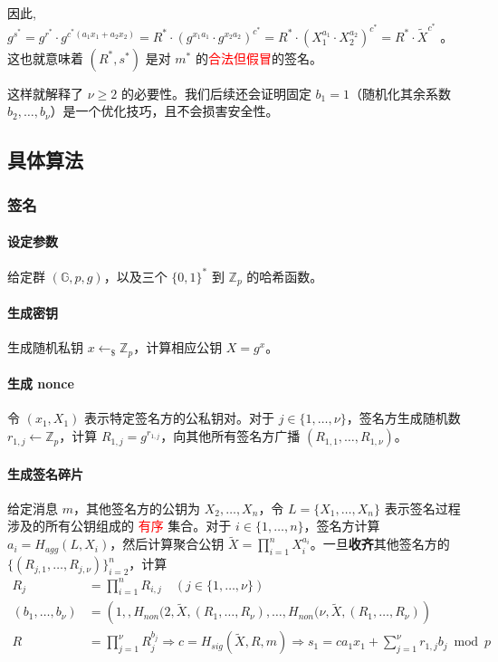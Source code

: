 \documentclass[a4paper,10pt]{article}
\newcommand{\bG}{\mathbb{G}}
\newcommand{\bZ}{\mathbb{Z}}
\begin{document}
因此, 
\(
  g^{s^*} = g^{r^*} \cdot g^{c^* (a_1 x_1 + a_2 x_2)}
          = R^* \cdot (g^{x_1 a_1}\cdot g^{x_2 a_2})^{c^*}
          = R^* \cdot (X_1^{a_1}\cdot X_2^{a_2})^{c^*}
          = R^* \cdot \tilde{X}^{c^*}
\)
。这也就意味着 \((R^*,s^*)\) 是对 \(m^*\) 的\textcolor{red}{合法但假冒}的签名。

这样就解释了 \(\nu\geq 2\) 的必要性。我们后续还会证明固定 \(b_1=1\)（随机化其余系数 \(b_2,\dots,b_{\nu}\)）是一个优化技巧，且不会损害安全性。

\subsection{具体算法}
\subsubsection{签名}
\paragraph{设定参数} 给定群 \((\bG,p,g)\)，以及三个 \(\{0,1\}^*\) 到 \(\bZ_p\) 的哈希函数。
\paragraph{生成密钥} 生成随机私钥 \(x\leftarrow_{\$} \bZ_p\)，计算相应公钥 \(X=g^x\)。
\paragraph{生成 nonce} 令 \((x_1,X_1)\) 表示特定签名方的公私钥对。对于 \(j\in\{1,\dots,\nu\}\)，签名方生成随机数 \(r_{1,j}\leftarrow \bZ_p\)，计算 \(R_{1,j}=g^{r_{1,j}}\)，向其他所有签名方广播 \((R_{1,1},\dots,R_{1,\nu})\)。
\paragraph{生成签名碎片} 给定消息 \(m\)，其他签名方的公钥为 \(X_2,\dots,X_n\)，令 \(L=\{X_1,\dots,X_n\}\) 表示签名过程涉及的所有公钥组成的 \textcolor{red}{有序} 集合。对于 \(i\in\{1,\dots,n\}\)，签名方计算 \(a_i=H_{agg}(L,X_i)\)，然后计算聚合公钥 \(\tilde{X}=\prod_{i=1}^n X_i^{a_i}\)。一旦\textbf{收齐}其他签名方的 \(\big\{(R_{j,1},\dots,R_{j,\nu})\big\}_{i=2}^n\)，计算 
\begin{align*}
  R_j &= \prod_{i=1}^n R_{i,j}\quad (j\in\{1,\dots,\nu\}) \\
  (b_1,\dots,b_{\nu}) &=\left(1,,H_{non}(2,\tilde{X},(R_1,\dots,R_{\nu}),\dots,H_{non}(\nu,\tilde{X},(R_1,\dots,R_{\nu})\right) \\
  R &= \prod_{j=1}^{\nu} R_j^{b_j} \Rightarrow c = H_{sig}(\tilde{X},R,m) \Rightarrow s_1 = ca_1x_1+\sum_{j=1}^{\nu}r_{1,j}b_j\bmod p
\end{align*}
\end{document}
